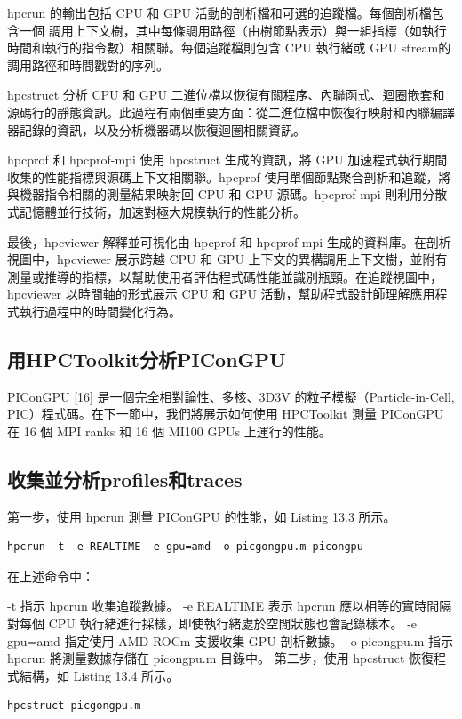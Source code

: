 hpcrun 的輸出包括 CPU 和 GPU 活動的剖析檔和可選的追蹤檔。每個剖析檔包含一個 調用上下文樹，其中每條調用路徑（由樹節點表示）與一組指標（如執行時間和執行的指令數）相關聯。每個追蹤檔則包含 CPU 執行緒或 GPU stream的調用路徑和時間戳對的序列。


hpcstruct 分析 CPU 和 GPU 二進位檔以恢復有關程序、內聯函式、迴圈嵌套和源碼行的靜態資訊。此過程有兩個重要方面：從二進位檔中恢復行映射和內聯編譯器記錄的資訊，以及分析機器碼以恢復迴圈相關資訊。

hpcprof 和 hpcprof-mpi 使用 hpcstruct 生成的資訊，將 GPU 加速程式執行期間收集的性能指標與源碼上下文相關聯。hpcprof 使用單個節點聚合剖析和追蹤，將與機器指令相關的測量結果映射回 CPU 和 GPU 源碼。hpcprof-mpi 則利用分散式記憶體並行技術，加速對極大規模執行的性能分析。

最後，hpcviewer 解釋並可視化由 hpcprof 和 hpcprof-mpi 生成的資料庫。在剖析視圖中，hpcviewer 展示跨越 CPU 和 GPU 上下文的異構調用上下文樹，並附有測量或推導的指標，以幫助使用者評估程式碼性能並識別瓶頸。在追蹤視圖中，hpcviewer 以時間軸的形式展示 CPU 和 GPU 活動，幫助程式設計師理解應用程式執行過程中的時間變化行為。

\subsection{用HPCToolkit分析PIConGPU}
PIConGPU [16] 是一個完全相對論性、多核、3D3V 的粒子模擬（Particle-in-Cell, PIC）程式碼。在下一節中，我們將展示如何使用 HPCToolkit 測量 PIConGPU 在 16 個 MPI ranks 和 16 個 MI100 GPUs 上運行的性能。


\subsection{收集並分析profiles和traces}
第一步，使用 hpcrun 測量 PIConGPU 的性能，如 Listing 13.3 所示。
\begin{lstlisting}[caption={Listing 13.3: Example of the hpcrun command.}]
hpcrun -t -e REALTIME -e gpu=amd -o picgongpu.m picongpu
\end{lstlisting}

在上述命令中：

-t 指示 hpcrun 收集追蹤數據。
-e REALTIME 表示 hpcrun 應以相等的實時間隔對每個 CPU 執行緒進行採樣，即使執行緒處於空閒狀態也會記錄樣本。
-e gpu=amd 指定使用 AMD ROCm 支援收集 GPU 剖析數據。
-o picongpu.m 指示 hpcrun 將測量數據存儲在 picongpu.m 目錄中。
第二步，使用 hpcstruct 恢復程式結構，如 Listing 13.4 所示。

\begin{lstlisting}[caption={Listing 13.4: Example of the hpcstruct command.}]
hpcstruct picgongpu.m
\end{lstlisting}


